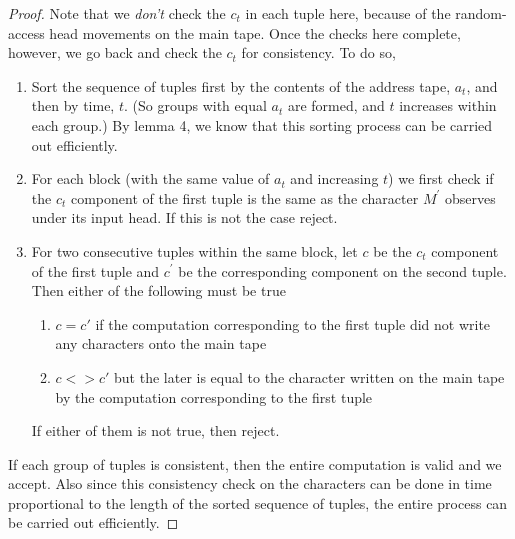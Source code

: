 \documentclass[english]{article}
\theoremstyle{plain}
\theoremstyle{definition}
\theoremstyle{plain}
\begin{document}
\begin{proof}
  Note that we \emph{don't} check the $c_{t}$ in each tuple here,
  because of the random-access head movements on the main tape. Once the
  checks here complete, however, we go back and check the $c_{t}$ for
  consistency. To do so,

  \begin{enumerate}
  \item Sort the sequence of tuples first by the contents of the
    address tape, $a_{t}$, and then by time, $t$. (So groups with
    equal $a_{t}$ are formed, and $t$ increases within each group.) By
    lemma 4, we know that this sorting process can be carried out
    efficiently.
  \item For each block (with the same value of $a_{t}$ and increasing
    $t$) we first check if the $c_t$ component of the first tuple is
    the same as the character $M^{'}$ observes under its input
    head. If this is not the case reject.
  \item For two consecutive tuples within the same block, let $c$ be
    the $c_t$ component of the first tuple and $c^{'}$ be the
    corresponding component on the second tuple. Then either of the
    following must be true
    \begin{enumerate}
    \item $c = c{'}$ if the computation corresponding to the first
      tuple did not write any characters onto the main tape
    \item $c <> c{'}$ but the later is equal to the character
      written on the main tape by the computation corresponding to
      the first tuple
    \end{enumerate}
    If either of them is not true, then reject.
  \end{enumerate}

  If each group of tuples is consistent, then the entire computation is
  valid and we accept. Also since this consistency check on the
  characters can be done in time proportional to the length of the
  sorted sequence of tuples, the entire process can be carried out
  efficiently.
\end{proof}



\end{document}
